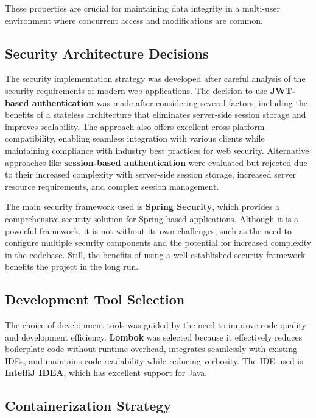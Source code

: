 These properties are crucial for maintaining data integrity in a multi-user environment where concurrent access and modifications are common.

\subsection{Security Architecture Decisions}\label{subsec:security-decisions}

The security implementation strategy was developed after careful analysis of the security requirements of modern web applications.
The decision to use \textbf{JWT-based authentication} was made after considering several factors, including the benefits of a stateless architecture that eliminates server-side session storage and improves scalability.
The approach also offers excellent cross-platform compatibility, enabling seamless integration with various clients while maintaining compliance with industry best practices for web security.
Alternative approaches like \textbf{session-based authentication} were evaluated but rejected due to their increased complexity with server-side session storage, increased server resource requirements, and complex session management.


The main security framework used is \textbf{Spring Security}, which provides a comprehensive security solution for Spring-based applications.
Although it is a powerful framework, it is not without its own challenges, such as the need to configure multiple security components and the potential for increased complexity in the codebase.
Still, the benefits of using a well-established security framework benefits the project in the long run.

\subsection{Development Tool Selection}\label{subsec:tool-selection}

The choice of development tools was guided by the need to improve code quality and development efficiency.
\textbf{Lombok} was selected because it effectively reduces boilerplate code without runtime overhead, integrates seamlessly with existing IDEs, and maintains code readability while reducing verbosity.
The IDE used is \textbf{IntelliJ IDEA}, which has excellent support for Java.

\subsection{Containerization Strategy}\label{subsec:containerization}

